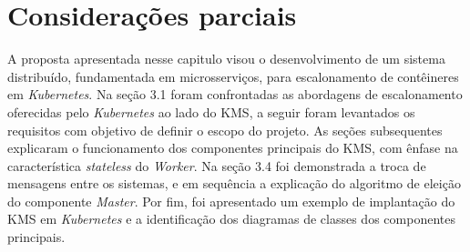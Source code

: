 \section{Considerações parciais}
A proposta apresentada nesse capitulo visou o desenvolvimento de um sistema distribuído, fundamentada em microsserviços, para escalonamento de contêineres em \textit{Kubernetes}. Na seção 3.1 foram confrontadas as abordagens de escalonamento oferecidas pelo \textit{Kubernetes} ao lado do \ac{KMS},  a seguir foram levantados os requisitos com objetivo de definir o escopo do projeto. As seções subsequentes explicaram o funcionamento dos componentes principais do \ac{KMS}, com ênfase na característica \textit{stateless} do \textit{Worker}. Na seção 3.4 foi demonstrada a troca de mensagens entre os sistemas, e em sequência a explicação do algoritmo de eleição do componente \textit{Master}. Por fim, foi apresentado um exemplo de implantação do \ac{KMS} em \textit{Kubernetes} e a identificação dos diagramas de classes dos componentes principais.
 





